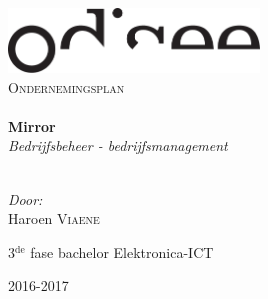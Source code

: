 \begin{titlepage}
\begin{center}
\includegraphics[width=0.5\textwidth]{./assets/logo.pdf}~\\[1cm]


\textsc{\Large Ondernemingsplan}\\[0.5cm]

\HRule \\[0.4cm]
{ \LARGE \bfseries Mirror}\\[0.4cm]
{\large \textit{Bedrijfsbeheer - bedrijfsmanagement}}\\[0.2cm]

\HRule \\[1.5cm]

\begin{minipage}{0.4\textwidth}
\begin{flushleft} \large
\emph{Door:}\\
Haroen \textsc{Viaene}\\

\end{flushleft}
\end{minipage}
\begin{minipage}{0.4\textwidth}
\begin{flushright} \large
\large{3$^{\text{de}}$ fase bachelor Elektronica-ICT}\\
\end{flushright}
\end{minipage}

\vfill

{\large 2016-2017}

\end{center}
\end{titlepage}
